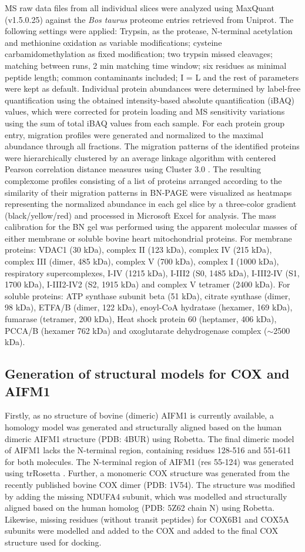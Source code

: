 MS raw data files from all individual slices were analyzed using MaxQuant (v1.5.0.25) against the \emph{Bos taurus} proteome entries retrieved from Uniprot. The following settings were applied: Trypsin, as the protease, N-terminal acetylation and methionine oxidation as variable modifications; cysteine carbamidomethylation as fixed modification; two trypsin missed cleavages; matching between runs, 2 min matching time window; six residues as minimal peptide length; common contaminants included; I = L and the rest of parameters were kept as default. Individual protein abundances were determined by label-free quantification using the obtained intensity-based absolute quantification (iBAQ) values, which were corrected for protein loading and MS sensitivity variations using the sum of total iBAQ values from each sample. For each protein group entry, migration profiles were generated and normalized to the maximal abundance through all fractions. The migration patterns of the identified proteins were hierarchically clustered by an average linkage algorithm with centered Pearson correlation distance measures using Cluster 3.0 \cite{RN67}. The resulting complexome profiles consisting of a list of proteins arranged according to the similarity of their migration patterns in BN-PAGE were visualized as heatmaps representing the normalized abundance in each gel slice by a three-color gradient (black/yellow/red) and processed in Microsoft Excel for analysis. The mass calibration for the BN gel was performed using the apparent molecular masses of either membrane or soluble bovine heart mitochondrial proteins. For membrane proteins: VDAC1 (30 kDa), complex II (123 kDa), complex IV (215 kDa), complex III (dimer, 485 kDa), complex V (700 kDa), complex I (1000 kDa), respiratory supercomplexes, I-IV (1215 kDa), I-III2 (S0, 1485 kDa), I-III2-IV (S1, 1700 kDa), I-III2-IV2 (S2, 1915 kDa) and complex V tetramer (2400 kDa). For soluble proteins: ATP synthase subunit beta (51 kDa), citrate synthase (dimer, 98 kDa), ETFA/B (dimer, 122 kDa), enoyl-CoA hydratase (hexamer, 169 kDa), fumarase (tetramer, 200 kDa), Heat shock protein 60 (heptamer, 406 kDa), PCCA/B (hexamer 762 kDa) and oxoglutarate dehydrogenase complex ($\sim$2500 kDa).
%
\subsection*{Generation of structural models for COX and AIFM1}
Firstly, as no structure of bovine (dimeric) AIFM1 is currently available, a homology model was generated and structurally aligned based on the human dimeric AIFM1 structure (PDB: 4BUR) using Robetta. The final dimeric model of AIFM1 lacks the N-terminal region, containing residues 128-516 and 551-611 for both molecules. The N-terminal region of AIFM1 (res 55-124) was generated using trRosetta \cite{RN39}. Further, a monomeric COX structure was generated from the recently published bovine COX dimer (PDB: 1V54). The structure was modified by adding the missing NDUFA4 subunit, which was modelled and structurally aligned based on the human homolog (PDB: 5Z62 chain N) using Robetta. Likewise, missing residues (without transit peptides) for COX6B1 and COX5A subunits were modelled and added to the COX and added to the final COX structure used for docking.
%
